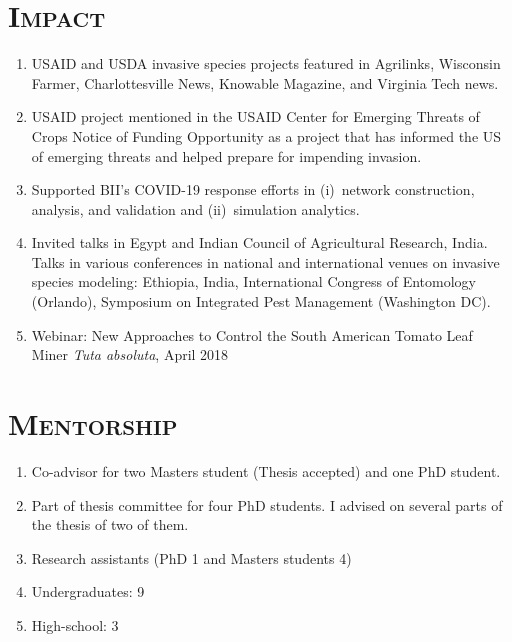 \documentclass[margin,10pt]{res} %
\begin{document}
\begin{resume}
{\section{\textnormal{\textsc{Impact}}}
\begin{enumerate}[$\circ$]
\item USAID and USDA invasive species projects featured in Agrilinks,
Wisconsin Farmer, Charlottesville News, Knowable Magazine, and Virginia
Tech news.
\item USAID project mentioned in the USAID Center for Emerging Threats of
Crops Notice of Funding Opportunity as a project that has informed the US
of emerging threats and helped prepare for impending invasion.
\item Supported BII's COVID-19 response efforts in (i)~network construction,
analysis, and validation and (ii)~simulation analytics. 
\item Invited talks in Egypt and Indian Council of Agricultural Research,
India. Talks in various conferences in national and international venues on
invasive species modeling: Ethiopia, India, International Congress of
Entomology (Orlando), Symposium on Integrated Pest Management (Washington
DC).
\item Webinar: New Approaches to Control the South American Tomato Leaf
Miner \emph{Tuta absoluta}, April 2018
\end{enumerate}
}

\section{\textnormal{\textsc{Mentorship}}}
\begin{enumerate}[$\circ$]
    \item Co-advisor for two Masters student (Thesis accepted) and one PhD
    student.
    \item Part of thesis committee for four PhD students. I advised on
    several parts of the thesis of two of them.
    \item Research assistants (PhD 1 and Masters students 4)
    \item Undergraduates: 9
    \item High-school: 3
\end{enumerate}


\end{resume}
\end{document}
